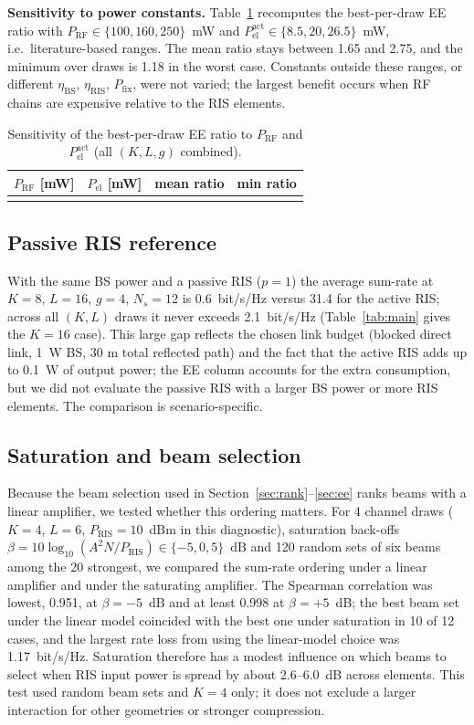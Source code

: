 \documentclass{ieeeaccess}
\begin{document}
\textbf{Sensitivity to power constants.} Table~\ref{tab:sens} recomputes the best-per-draw EE ratio with $P_\mathrm{RF}\in\{100,160,250\}$~mW and $P_\mathrm{el}^\mathrm{act}\in\{8.5,20,26.5\}$~mW, i.e.\ literature-based ranges. The mean ratio stays between 1.65 and 2.75, and the minimum over draws is 1.18 in the worst case. Constants outside these ranges, or different $\eta_\mathrm{BS}$, $\eta_\mathrm{RIS}$, $P_\mathrm{fix}$, were not varied; the largest benefit occurs when RF chains are expensive relative to the RIS elements.

\begin{table}[t]\centering\caption{Sensitivity of the best-per-draw EE ratio to $P_\mathrm{RF}$ and $P_\mathrm{el}^\mathrm{act}$ (all $(K,L,g)$ combined).}\label{tab:sens}\small
\begin{tabular}{@{}rrcc@{}}\toprule $P_\mathrm{RF}$ [mW] & $P_\mathrm{el}$ [mW] & mean ratio & min ratio\\\midrule\\
\bottomrule\end{tabular}\end{table}

\subsection{Passive RIS reference}
With the same BS power and a passive RIS ($p=1$) the average sum-rate at $K=8$, $L=16$, $g=4$, $N_s=12$ is 0.6~bit/s/Hz versus 31.4 for the active RIS; across all $(K,L)$ draws it never exceeds 2.1~bit/s/Hz (Table~\ref{tab:main} gives the $K=16$ case). This large gap reflects the chosen link budget (blocked direct link, 1~W BS, $30$ m total reflected path) and the fact that the active RIS adds up to 0.1~W of output power; the EE column accounts for the extra consumption, but we did not evaluate the passive RIS with a larger BS power or more RIS elements. The comparison is scenario-specific.

\subsection{Saturation and beam selection}\label{sec:dec}
Because the beam selection used in Section~\ref{sec:rank}--\ref{sec:ee} ranks beams with a linear amplifier, we tested whether this ordering matters. For 4 channel draws ($K=4$, $L=6$, $P_\mathrm{RIS}=10$~dBm in this diagnostic), saturation back-offs $\beta=10\log_{10}(A^2N/P_\mathrm{RIS})\in\{-5,0,5\}$~dB and 120 random sets of six beams among the 20 strongest, we compared the sum-rate ordering under a linear amplifier and under the saturating amplifier. The Spearman correlation was lowest, 0.951, at $\beta=-5$~dB and at least 0.998 at $\beta=+5$~dB; the best beam set under the linear model coincided with the best one under saturation in 10 of 12 cases, and the largest rate loss from using the linear-model choice was 1.17~bit/s/Hz. Saturation therefore has a modest influence on which beams to select when RIS input power is spread by about 2.6--6.0~dB across elements. This test used random beam sets and $K=4$ only; it does not exclude a larger interaction for other geometries or stronger compression.
\end{document}
